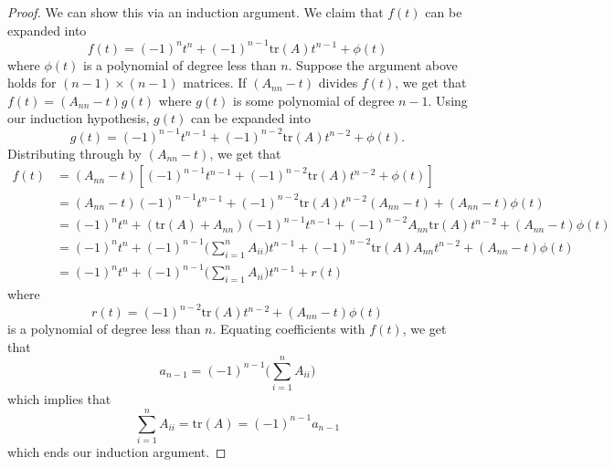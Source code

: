 \begin{enumerate}
\begin{proof}
        We can show this via an induction argument. We claim that \( f(t) \) can be expanded into 
        \[  f(t) = (-1)^{n} t^{n} + (-1)^{n-1} \text{tr}(A) t^{n-1} + \phi(t) \]
        where \( \phi(t) \) is a polynomial of degree less than \( n  \).
        Suppose the argument above holds for \( (n - 1) \times (n-1)  \) matrices. If \( ({A}_{n n } - t) \) divides \( f(t) \), we get that \( f(t) = ({A}_{n n } - t) g(t) \) where \( g(t) \) is some polynomial of degree \( n - 1 \). Using our induction hypothesis, \( g(t) \) can be expanded into 
        \[  g(t) = (-1)^{n-1} t^{n-1} + (-1)^{n-2} \text{tr}(A) t^{n-2} + \phi(t). \]
        Distributing through by \( ({A}_{n n } -t) \), we get that
        \begin{align*}
            f(t) &= ({A}_{n n } - t) [(-1)^{n-1} t^{n-1} + (-1)^{n-2} \text{tr}(A) t^{n-2} + \phi(t)] \\
                 &= ({A}_{n n } -t) (-1)^{n-1} t^{n-1} + (-1)^{n-2}  \text{tr}(A) t^{n-2} ({A}_{n n} -t) + ({A}_{n n} -t)\phi(t) \\
                 &= (-1)^{n} t^{n} + (\text{tr}(A) + {A}_{nn}) (-1)^{n-1}t^{n-1} + (-1)^{n-2} {A}_{nn} \text{tr}(A) t^{n-2} + ({A}_{nn} - t) \phi(t) \\
                 &= (-1)^{n} t^{n} + (-1)^{n-1}\Big( \sum_{ i=1 }^{ n } {A}_{ii} \Big) t^{n-1} + (-1)^{n-2} \text{tr}(A) {A}_{nn} t^{n-2} + ({A}_{nn} -t)\phi(t) \\
                 &= (-1)^{n} t^{n} + (-1)^{n-1} \Big( \sum_{ i=1 }^{ n } {A}_{ii} \Big) t^{n-1} + r(t)
        \end{align*}
        where
        \[ r(t) = (-1)^{n-2}\text{tr}(A) t^{n-2} + ({A}_{nn} -t)\phi(t) \]
        is a polynomial of degree less than \( n  \).
        Equating coefficients with \( f(t) \), we get that 
        \[  {a}_{n-1} = (-1)^{n-1} \Big( \sum_{ i=1 }^{ n } {A}_{ii} \Big) \]
        which implies that
        \[ \sum_{ i=1 }^{ n } {A}_{ii} = \text{tr}(A) = (-1)^{n-1}{a}_{n-1}  \]
        which ends our induction argument.
\end{proof}
\end{enumerate}

